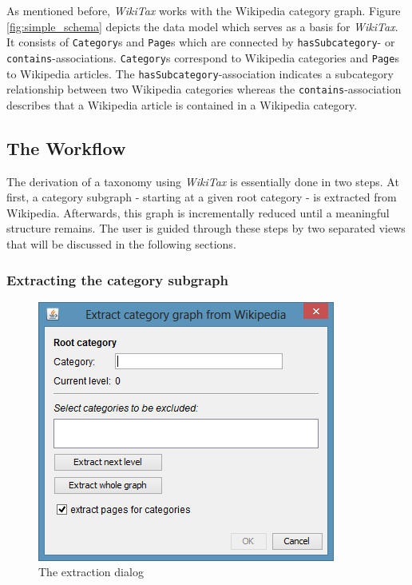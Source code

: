 \documentclass{scrartcl}
\begin{document}
As mentioned before, \emph{WikiTax} works with the Wikipedia category graph. Figure \ref{fig:simple_schema} depicts the data model which serves as a basis for \emph{WikiTax}. It consists of \texttt{Category}s and \texttt{Page}s which are connected by \texttt{hasSubcategory}- or \texttt{contains}-associations. \texttt{Category}s correspond to Wikipedia categories and \texttt{Page}s to Wikipedia articles. The \texttt{hasSubcategory}-association indicates a subcategory relationship between two Wikipedia categories whereas the \texttt{contains}-association describes that a Wikipedia article is contained in a Wikipedia category.

\subsection{The Workflow}
The derivation of a taxonomy using \emph{WikiTax} is essentially done in two steps. At first, a category subgraph - starting at a given root category - is extracted from Wikipedia. Afterwards, this graph is incrementally reduced until a meaningful structure remains. The user is guided through these steps by two separated views that will be discussed in the following sections.

\subsubsection{Extracting the category subgraph}

\begin{figure}[ht]
  \centering
  \includegraphics[scale=0.60]{figures/extraction_dialog.png}
  \caption{The extraction dialog}
  \label{fig:extaction_dialog}
\end{figure}
\end{document}

